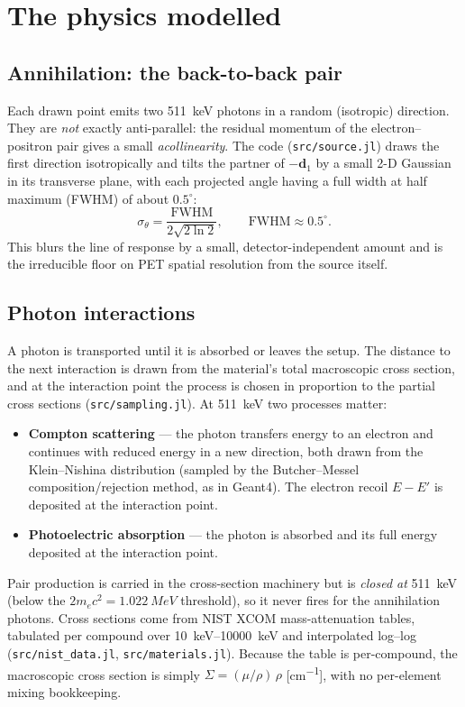 \documentclass[11pt]{article}
\begin{document}
\section{The physics modelled}
\label{sec:physics}

\subsection{Annihilation: the back-to-back pair}
Each drawn point emits two \SI{511}{keV} photons in a random (isotropic) direction. They
are \emph{not} exactly anti-parallel: the residual momentum of the electron--positron pair
gives a small \emph{acollinearity}. The code (\texttt{src/source.jl}) draws the first
direction isotropically and tilts the partner of $-\mathbf{d}_1$ by a small \mbox{2-D}
Gaussian in its transverse plane, with each projected angle having a full width at half
maximum (FWHM) of about $0.5^\circ$:
\begin{equation}
\sigma_\theta = \frac{\mathrm{FWHM}}{2\sqrt{2\ln 2}}, \qquad
\mathrm{FWHM} \approx 0.5^\circ .
\end{equation}
This blurs the line of response by a small, detector-independent amount and is the
irreducible floor on PET spatial resolution from the source itself.

\subsection{Photon interactions}
A photon is transported until it is absorbed or leaves the setup. The distance to the next
interaction is drawn from the material's total macroscopic cross section, and at the
interaction point the process is chosen in proportion to the partial cross sections
(\texttt{src/sampling.jl}). At \SI{511}{keV} two processes matter:
\begin{itemize}[nosep]
\item \textbf{Compton scattering} --- the photon transfers energy to an electron and
continues with reduced energy in a new direction, both drawn from the Klein--Nishina
distribution (sampled by the Butcher--Messel composition/rejection method, as in Geant4).
The electron recoil $E-E'$ is deposited at the interaction point.
\item \textbf{Photoelectric absorption} --- the photon is absorbed and its full energy
deposited at the interaction point.
\end{itemize}
Pair production is carried in the cross-section machinery but is \emph{closed at}
\SI{511}{keV} (below the $2m_ec^2 = \SI{1.022}{MeV}$ threshold), so it never fires for the
annihilation photons. Cross sections come from NIST XCOM mass-attenuation tables, tabulated
per compound over \SIrange{10}{10000}{keV} and interpolated log--log
(\texttt{src/nist\_data.jl}, \texttt{src/materials.jl}). Because the table is per-compound,
the macroscopic cross section is simply $\Sigma = (\mu/\rho)\,\rho$ [\si{cm^{-1}}], with no
per-element mixing bookkeeping.
\end{document}
